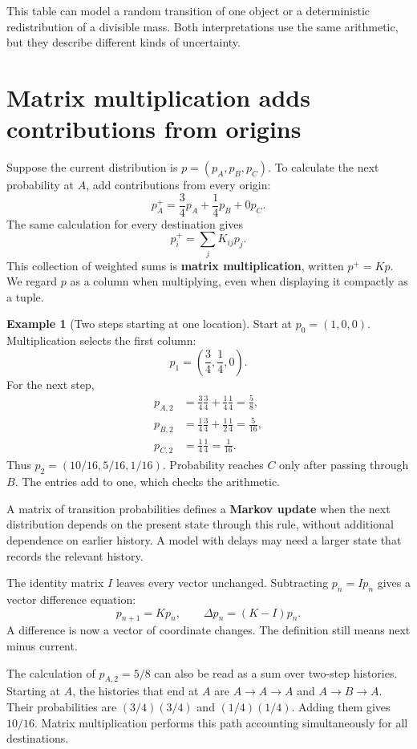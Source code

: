 \documentclass[11pt,oneside,openany]{book}
\theoremstyle{definition}
\newtheorem{example}{Example}[chapter]
\theoremstyle{remark}
\numberwithin{equation}{chapter}
\begin{document}
This table can model a random transition of one object or a deterministic redistribution of a divisible mass. Both interpretations use the same arithmetic, but they describe different kinds of uncertainty.

\section{Matrix multiplication adds contributions from origins}\label{ch04-matrix-multiplication-adds-contributions-from-origins}

Suppose the current distribution is \(p=(p_A,p_B,p_C)\). To calculate the next probability at \(A\), add contributions from every origin: \[p_A^+=\frac34p_A+\frac14p_B+0p_C.\] The same calculation for every destination gives \[p_i^+=\sum_j K_{ij}p_j.\] This collection of weighted sums is \textbf{matrix multiplication}, written \(p^+=Kp\). We regard \(p\) as a column when multiplying, even when displaying it compactly as a tuple.

\begin{example}[Two steps starting at one location]

Start at \(p_0=(1,0,0)\). Multiplication selects the first column: \[p_1=\left(\frac34,\frac14,0\right).\] For the next step, \[\begin{aligned}
p_{A,2}&=\frac34\frac34+\frac14\frac14=\frac58,\\
p_{B,2}&=\frac14\frac34+\frac12\frac14=\frac5{16},\\
p_{C,2}&=\frac14\frac14=\frac1{16}.
\end{aligned}\] Thus \(p_2=(10/16,5/16,1/16)\). Probability reaches \(C\) only after passing through \(B\). The entries add to one, which checks the arithmetic.

\end{example}

A matrix of transition probabilities defines a \textbf{Markov update} when the next distribution depends on the present state through this rule, without additional dependence on earlier history. A model with delays may need a larger state that records the relevant history.

The identity matrix \(I\) leaves every vector unchanged. Subtracting \(p_n=Ip_n\) gives a vector difference equation: \[\boxed{p_{n+1}=Kp_n,\qquad \Delta p_n=(K-I)p_n.}\] A difference is now a vector of coordinate changes. The definition still means next minus current.

The calculation of \(p_{A,2}=5/8\) can also be read as a sum over two-step histories. Starting at \(A\), the histories that end at \(A\) are \(A\to A\to A\) and \(A\to B\to A\). Their probabilities are \((3/4)(3/4)\) and \((1/4)(1/4)\). Adding them gives \(10/16\). Matrix multiplication performs this path accounting simultaneously for all destinations.
\end{document}
